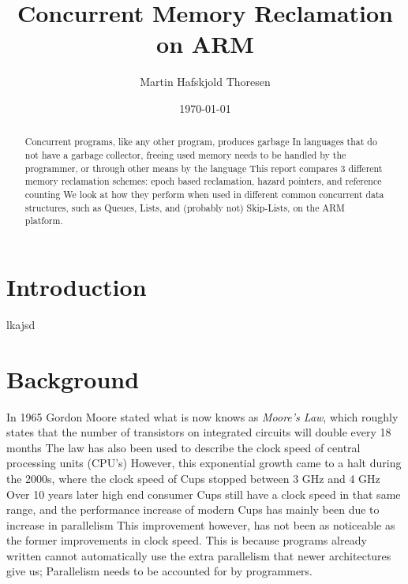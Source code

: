 \documentclass[b5paper]{report}
\begin{document}
\title{Concurrent Memory Reclamation on ARM}
\author{Martin Hafskjold Thoresen}
\date{\today}
\maketitle



\begin{abstract}
  Concurrent programs, like any other program, produces garbage In languages
  that do not have a garbage collector, freeing used memory needs to be
  handled by the programmer, or through other means by the language This
  report compares 3 different memory reclamation schemes: epoch based
  reclamation, hazard pointers, and reference counting We look at how they
  perform when used in different common concurrent data structures, such as
  Queues, Lists, and (probably not) Skip-Lists, on the ARM platform.
\end{abstract}

\chapter{Introduction}

lkajsd

\tableofcontents

\chapter{Background}

In 1965 Gordon Moore stated what is now knows as \emph{Moore's Law}, which
roughly states that the number of transistors on integrated circuits will
double every 18 months The law has also been used to describe the clock speed
of central processing units (CPU's) However, this exponential growth came to a
halt during the 2000s, where the clock speed of Cups stopped between 3 GHz and
4 GHz Over 10 years later high end consumer Cups still have a clock speed in
that same range, and the performance increase of modern Cups has mainly been
due to increase in parallelism This improvement however, has not been as
noticeable as the former improvements in clock speed. This is because programs
already written cannot automatically use the extra parallelism that newer
architectures give us; Parallelism needs to be accounted for by programmers.
\end{document}
